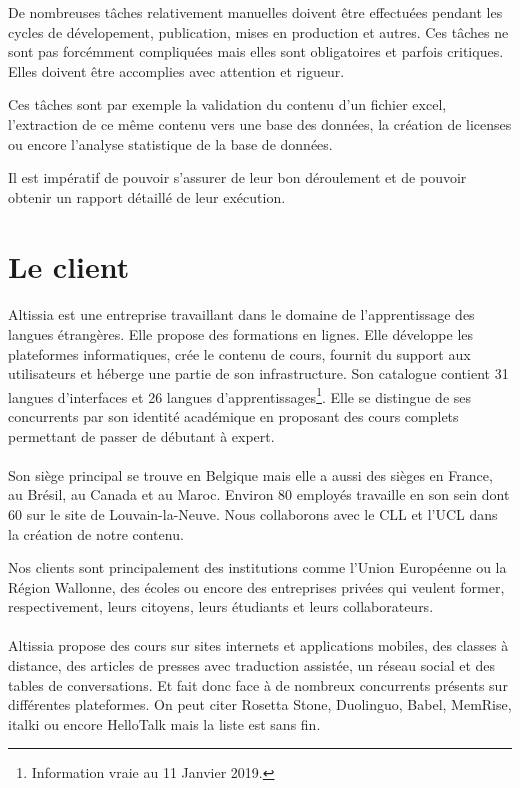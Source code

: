 De nombreuses tâches relativement manuelles doivent être effectuées pendant les cycles de dévelopement, publication,
mises en production et autres.
Ces tâches ne sont pas forcémment compliquées mais elles sont obligatoires et parfois critiques.
Elles doivent être accomplies avec attention et rigueur.

Ces tâches sont par exemple la validation du contenu d'un fichier excel, l'extraction de ce même contenu vers une base des données,
la création de licenses ou encore l'analyse statistique de la base de données.

Il est impératif de pouvoir s'assurer de leur bon déroulement et de pouvoir obtenir un rapport détaillé
de leur exécution.

\section{Le client}
\label{sec:customer}

    \paragraph{}
    Altissia est une entreprise travaillant dans le domaine de l'apprentissage des langues étrangères.
    Elle propose des formations en lignes.
    Elle développe les plateformes informatiques, crée le contenu de cours, fournit du support aux utilisateurs et héberge une
    partie de son infrastructure.
    Son catalogue contient 31 langues d'interfaces et 26 langues d'apprentissages\footnote{Information vraie au 11 Janvier 2019.}.
    Elle se distingue de ses concurrents par son identité académique en proposant des cours complets permettant de passer de débutant à expert.

    \paragraph{}
    Son siège principal se trouve en Belgique mais elle a aussi des sièges en France, au Brésil, au Canada et au Maroc.
    Environ 80 employés travaille en son sein dont 60 sur le site de Louvain-la-Neuve.
    Nous collaborons avec le CLL et l'UCL dans la création de notre contenu.

    Nos clients sont principalement des institutions comme l'Union Européenne ou la Région Wallonne, des écoles ou encore
    des entreprises privées qui veulent former, respectivement, leurs citoyens, leurs étudiants et leurs collaborateurs.

    \paragraph{}
    Altissia propose des cours sur sites internets et applications mobiles, des classes à distance, des articles de presses
    avec traduction assistée, un réseau social et des tables de conversations.
    Et fait donc face à de nombreux concurrents présents sur différentes plateformes.
    On peut citer Rosetta Stone, Duolinguo, Babel, MemRise, italki ou encore HelloTalk mais la liste est sans fin.

